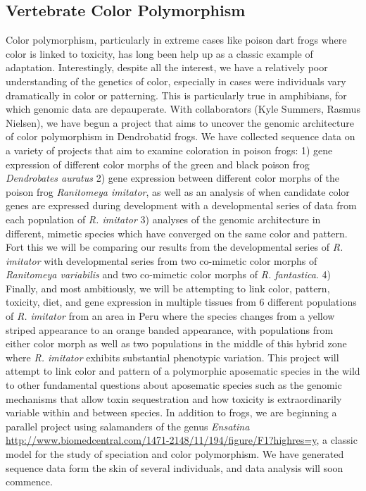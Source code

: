 \documentclass[10.5pt]{article}
\begin{document}
{\subsection*{Vertebrate Color Polymorphism}


\noindent
Color polymorphism, particularly in extreme cases like poison dart frogs where color is linked to toxicity, has long been help up as a classic example of adaptation. Interestingly, despite all the interest, we have a relatively poor understanding of the genetics of color, especially in cases were individuals vary dramatically in color or patterning. This is particularly true in amphibians, for which genomic data are depauperate. With collaborators (Kyle Summers, Rasmus Nielsen), we have begun a project that aims to uncover the genomic architecture of color polymorphism in Dendrobatid frogs.  We have collected sequence data on a variety of projects that aim to examine coloration in poison frogs: 1) gene expression of different color morphs of the green and black poison frog \textit{Dendrobates auratus} 2) gene expression between different color morphs of the poison frog \textit{Ranitomeya imitator}, as well as an analysis of when candidate color genes are expressed during development with a developmental series of data from each population of \textit{R. imitator} 3) analyses of the genomic architecture in different, mimetic species which have converged on the same color and pattern. Fort this we will be comparing our results from the developmental series of \textit{R. imitator} with developmental series from two co-mimetic color morphs of \textit{Ranitomeya variabilis} and two co-mimetic color morphs of \textit{R. fantastica}. 4) Finally, and most ambitiously, we will be attempting to link color, pattern, toxicity, diet, and gene expression in multiple tissues from 6 different populations of \textit{R. imitator} from an area in Peru where the species changes from a yellow striped appearance to an orange banded appearance, with populations from either color morph as well as two populations in the middle of this hybrid zone where \textit{R. imitator} exhibits substantial phenotypic variation. This project will attempt to link color and pattern of a polymorphic aposematic species in the wild to other fundamental questions about aposematic species such as the genomic mechanisms that allow toxin sequestration and how toxicity is extraordinarily variable within and between species. In addition to frogs, we are beginning a parallel project using salamanders of the genus \textit{Ensatina} \url{http://www.biomedcentral.com/1471-2148/11/194/figure/F1?highres=y}, a classic model for the study of speciation and color polymorphism.  We have generated sequence data form the skin of several individuals, and data analysis will soon commence.   

}
\end{document}
